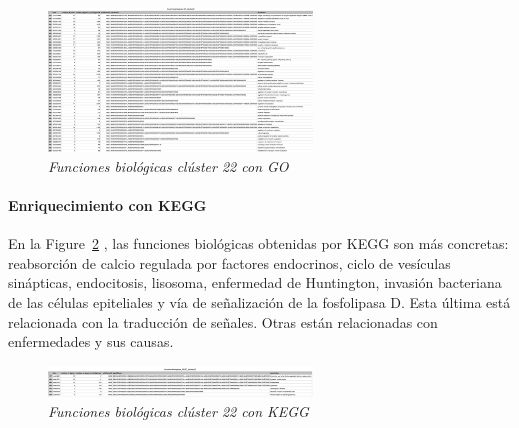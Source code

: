 \begin{figure}[h]
	\centering
	\includegraphics[width=70mm,scale=1.2]{figures/cluster22_GO.png}
	\caption{\textit{Funciones biológicas clúster 22 con GO}}
	\label{22go}
\end{figure}

\paragraph{Enriquecimiento con KEGG}

En la Figure~\ref{22kegg} , las funciones biológicas obtenidas por KEGG son más concretas: reabsorción de calcio regulada por factores endocrinos, ciclo de vesículas sinápticas, endocitosis, lisosoma, enfermedad de Huntington, invasión bacteriana de las células epiteliales y vía de señalización de la fosfolipasa D. Esta última está relacionada con la traducción de señales. Otras están relacionadas con enfermedades y sus causas.

\begin{figure}[h]
	\centering
	\includegraphics[width=70mm,scale=1.2]{figures/cluster22_KEGG.png}
	\caption{\textit{Funciones biológicas clúster 22 con KEGG}}
	\label{22kegg}
\end{figure}
